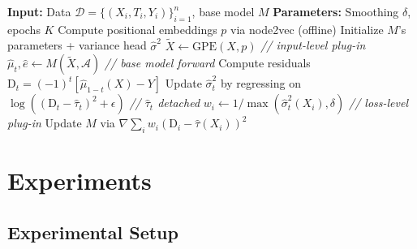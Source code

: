 \documentclass[sigconf,anonymous,review]{acmart}
\begin{document}
\begin{algorithm}[t]
    \caption{Plug-in Training Procedure}
    \label{alg:pact}
    \begin{algorithmic}[1]
        \STATE \textbf{Input:} Data $\mathcal{D}=\{(X_i, T_i, Y_i)\}_{i=1}^n$, base model $M$
        \STATE \textbf{Parameters:} Smoothing $\delta$, epochs $K$
        \STATE Compute positional embeddings $p$ via node2vec (offline)
        \STATE Initialize $M$'s parameters + variance head $\hat{\sigma}^2$
            \STATE $\tilde{X} \leftarrow \mathrm{GPE}(X, p)$ \hfill \textit{// input-level plug-in}
            \STATE $\hat{\mu}_t, \hat{e} \leftarrow M(\tilde{X}, \mathcal{A})$ \hfill \textit{// base model forward}
            \STATE Compute residuals $\mathrm{D}_t = (-1)^t[\hat{\mu}_{1-t}(X) - Y]$
            \STATE Update $\hat{\sigma}^2_t$ by regressing on $\log((\mathrm{D}_t - \hat{\tau}_t)^2 + \epsilon)$ \hfill \textit{// $\hat{\tau}_t$ detached}
            \STATE $w_i \leftarrow 1/\max(\hat{\sigma}^2_t(X_i), \delta)$ \hfill \textit{// loss-level plug-in}
            \STATE Update $M$ via $\nabla \sum_i w_i (\mathrm{D}_i - \hat{\tau}(X_i))^2$
        \ENDFOR
    \end{algorithmic}
\end{algorithm}

\section{Experiments}\label{sec:exp}

\subsection{Experimental Setup}
\end{document}

